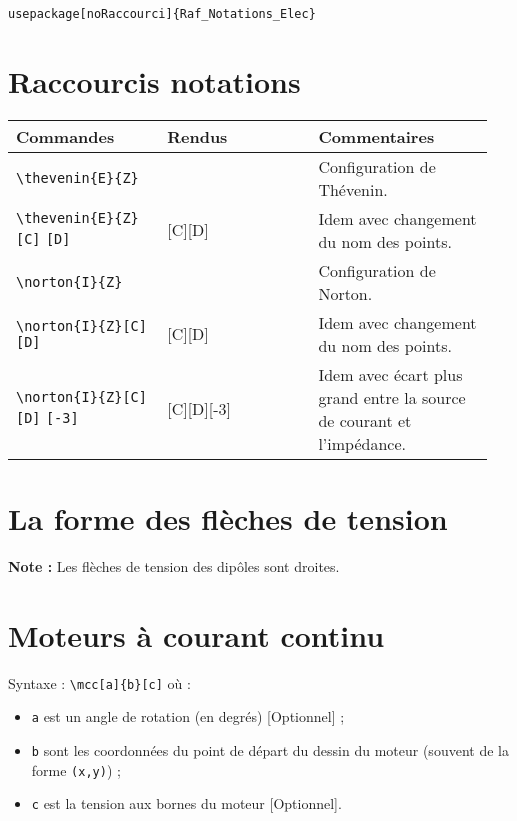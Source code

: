 \documentclass[a4paper,12pt]{article}
\begin{document}
		\begin{verbatim}
usepackage[noRaccourci]{Raf_Notations_Elec}
		\end{verbatim}


	\section{Raccourcis notations}
		\noindent
		\begin{tabular}{|p{0.3\linewidth}|p{0.3\linewidth}|p{0.35\linewidth}|}
			\hline
				\textbf{Commandes}&\textbf{Rendus}&\textbf{Commentaires}
			\\\hline\hline
				\verb!\thevenin{E}{Z}!			&	\thevenin{E}{Z}		&	Configuration de Thévenin.
			\\\hline
				\verb!\thevenin{E}{Z}[C]! \verb![D]!		&	\thevenin{E}{Z}[C][D]	&	Idem avec changement du nom des points.
			\\\hline
				\verb!\norton{I}{Z}!			&	\norton{I}{Z}		&	Configuration de Norton.
			\\\hline
				\verb!\norton{I}{Z}[C][D]!	&	\norton{I}{Z}[C][D]	&	Idem avec changement du nom des points.
			\\\hline
				\verb!\norton{I}{Z}[C][D]! \verb![-3]!	&	\norton{I}{Z}[C][D][-3]	&	Idem avec écart plus grand entre la source de courant et l'impédance.
			\\\hline
		\end{tabular}

		

	\section{La forme des flèches de tension}
		\textbf{Note : } Les flèches de tension des dipôles sont droites.
		
		
	\section{Moteurs à courant continu}
	
	Syntaxe : \verb!\mcc[a]{b}[c]! où :
	\begin{itemize}
		\item \verb!a! est un angle de rotation (en degrés) [Optionnel] ;
		\item \verb!b! sont les coordonnées du point de départ du dessin du moteur (souvent de la forme \verb!(x,y)!) ;
		\item \verb!c! est la tension aux bornes du moteur [Optionnel].
	\end{itemize}
	
\end{document}
